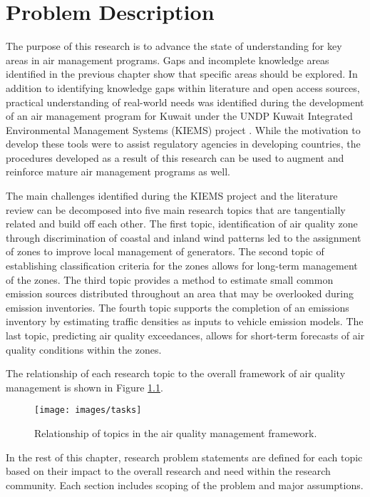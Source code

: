 \chapter{Problem Description}
The purpose of this research is to advance the state of understanding for key areas in air management programs. Gaps and incomplete knowledge areas identified in the previous chapter show that specific areas should be explored. In addition to identifying knowledge gaps within literature and open access sources, practical understanding of real-world needs was identified during the development of an air management program for Kuwait under the UNDP Kuwait Integrated Environmental Management Systems (KIEMS) project \citep{UNDP2012}.  While the motivation to develop these tools were to assist regulatory agencies in developing countries, the procedures developed as a result of this research can be used to augment and reinforce mature air management programs as well.  

The main challenges identified during the KIEMS project and the literature review can be decomposed into five main research topics that are tangentially related and build off each other. The first topic, identification of air quality zone through discrimination of coastal and inland wind patterns led to the assignment of zones to improve local management of generators. The second topic of establishing classification criteria for the zones allows for long-term management of the zones.  The third topic provides a method to estimate small common emission sources distributed throughout an area that may be overlooked during emission inventories. The fourth topic supports the completion of an emissions inventory by estimating traffic densities as inputs to vehicle emission models. The last topic, predicting air quality exceedances, allows for short-term forecasts of air quality conditions within the zones. 

The relationship of each research topic to the overall framework of air quality management is shown in Figure \ref{fig:tasks}. 
%
\begin{figure}[H]
\centering
\texttt{[image: images/tasks]}  %
\caption{Relationship of topics in the air quality management framework.}
\label{fig:tasks}
\end{figure}
%

In the rest of this chapter, research problem statements are defined for each topic based on their impact to the overall research and need within the research community. Each section includes scoping of the problem and major assumptions.

